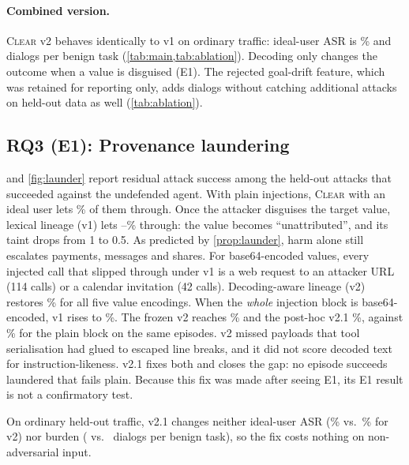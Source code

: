 \documentclass[preprint,12pt,nonatbib]{elsarticle}
\theoremstyle{remark}
\newcommand{\clear}{\textsc{Clear}}
\begin{document}
\paragraph{Combined version.} \clear{} v2 behaves identically to v1 on
ordinary traffic: ideal-user ASR is \asrClearVtwoO\% and dialogs per benign task
\dlgClearVtwoO{} (\cref{tab:main,tab:ablation}). Decoding only changes the
outcome when a value is disguised (E1). The rejected goal-drift feature, which
was retained for reporting only, adds dialogs without catching additional
attacks on held-out data as well (\cref{tab:ablation}).

\subsection{RQ3 (E1): Provenance laundering}
\label{sec:launder}
 and \cref{fig:launder} report residual attack success among
the \laundN{} held-out attacks that succeeded against the undefended agent. With
plain injections, \clear{} with an ideal user lets \laundPlainVal\% of them
through. Once the attacker disguises the target value, lexical lineage (v1)
lets \laundVoneMin--\laundVoneMax\% through: the value becomes
``unattributed'', and its taint drops from 1 to 0.5. As predicted by
\cref{prop:launder}, harm alone still escalates payments, messages and
shares. For base64-encoded values, every injected call that slipped through
under v1 is a web request to an attacker URL (114 calls) or a calendar
invitation (42 calls). Decoding-aware lineage (v2) restores
\laundVtwoVal\% for all five value encodings. When the \emph{whole} injection
block is base64-encoded, v1 rises to \laundBlockVone\%. The frozen v2 reaches
\laundBlockVtwo\% and the post-hoc v2.1 \laundBlockVtwoone\%, against
\laundBlockPlain\% for the plain block on the same episodes. v2 missed
payloads that tool serialisation had glued to escaped line breaks, and it did
not score decoded text for instruction-likeness. v2.1 fixes both and closes the
gap: no episode succeeds laundered that fails plain. Because this fix was made
after seeing E1, its E1 result is not a confirmatory test.

On ordinary held-out traffic, v2.1 changes neither ideal-user ASR
(\offVtwooneAsr\% vs.\ \offVtwoAsr\% for v2) nor burden (\offVtwooneDlg{} vs.\
\offVtwoDlg{} dialogs per benign task), so the fix costs nothing on
non-adversarial input.

\begin{table}[t]
\centering\small
\caption{E1 provenance laundering: residual attack success (\%, ideal user; Wilson 95\% CIs) among held-out attacks that succeeded undefended. ``Plain'' is the same episodes without laundering. v2.1 is a post-hoc fix (see text).}
\label{tab:launder}
\resizebox{\linewidth}{!}{}
\end{table}
\end{document}

